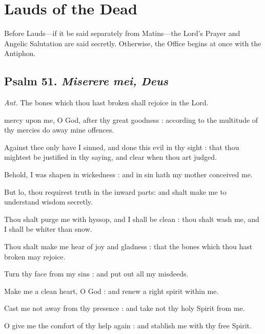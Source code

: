 \section{Lauds of the Dead}\label{laudsdead}
\begin{secrubric}
    Before Lauds---if it be said separately from Matins---the Lord's Prayer and Angelic Salutation are said secretly. Otherwise, the Office begins at once with the Antiphon.
\end{secrubric}
\subsection{Psalm 51. \textit{Miserere mei, Deus}}\par\noindent
\textit{Ant.} The bones which thou hast broken {\dag} shall rejoice in the Lord.\par
{} mercy upon me, O God, after thy great goodness : according to the multitude of thy mercies do away mine offences.\par
{}
Against thee only have I sinned, and done this evil in thy sight : that thou mightest be justified in thy saying, and clear when thou art judged.\par
{}Behold, I was shapen in wickedness : and in sin hath my mother conceived me.\par
{}But lo, thou requirest truth in the inward parts: and shalt make me to understand wisdom secretly.\par
{}Thou shalt purge me with hyssop, and I shall be clean : thou shalt wash me, and I shall be whiter than snow.\par
{}Thou shalt make me hear of joy and gladness : that the bones which thou hast broken may rejoice.\par
{}Turn thy face from my sins : and put out all my misdeeds.\par
{}Make me a clean heart, O God : and renew a right spirit within me.\par
{}Cast me not away from thy presence : and take not thy holy Spirit from me.\par
{}O give me the comfort of thy help again : and stablish me with thy free Spirit.\par
